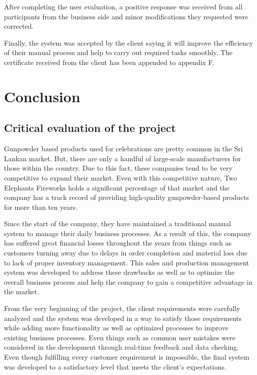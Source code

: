 \documentclass[12pt]{report}
\begin{document}
After completing the user evaluation, a positive response was received from all participants from the business side and minor modifications they requested were corrected.

Finally, the system was accepted by the client saying it will improve the efficiency of their manual process and help to carry out required tasks smoothly. The certificate received from the client has been appended to appendix F.

\chapter{Conclusion}

\section{Critical evaluation of the project}
Gunpowder based products used for celebrations are pretty common in the Sri Lankan market. But, there are only a handful of large-scale manufacturers for those within the country. Due to this fact, these companies tend to be very competitive to expand their market. Even with this competitive nature, Two Elephants Fireworks holds a significant percentage of that market and the company has a track record of providing high-quality gunpowder-based products for more than ten years.

Since the start of the company, they have maintained a traditional manual system to manage their daily business processes. As a result of this, the company has suffered great financial losses throughout the years from things such as customers turning away due to delays in order completion and material loss due to lack of proper inventory management. This sales and production management system was developed to address these drawbacks as well as to optimize the overall business process and help the company to gain a competitive advantage in the market.

From the very beginning of the project, the client requirements were carefully analyzed and the system was developed in a way to satisfy those requirements while adding more functionality as well as optimized processes to improve existing business processes. Even things such as common user mistakes were considered in the development through real-time feedback and data checking. Even though fulfilling every customer requirement is impossible, the final system was developed to a satisfactory level that meets the client's expectations.
\end{document}
